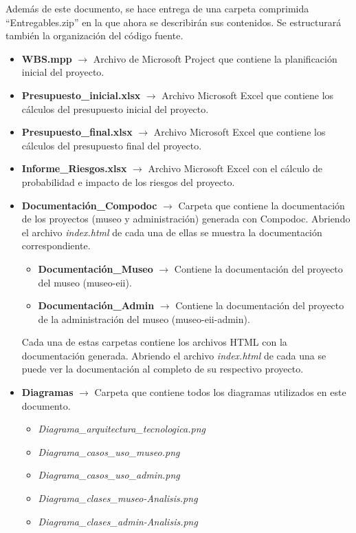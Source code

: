 Además de este documento, se hace entrega de una carpeta comprimida ``Entregables.zip'' en la que ahora se describirán sus contenidos. Se estructurará también la organización del código fuente.
\begin{itemize}
	\item \textbf{WBS.mpp} \(\rightarrow\) Archivo de Microsoft Project que contiene la planificación inicial del proyecto.
	\item \textbf{Presupuesto\_inicial.xlsx} \(\rightarrow\) Archivo Microsoft Excel que contiene los cálculos del presupuesto inicial del proyecto.
	\item \textbf{Presupuesto\_final.xlsx} \(\rightarrow\) Archivo Microsoft Excel que contiene los cálculos del presupuesto final del proyecto.
	\item \textbf{Informe\_Riesgos.xlsx} \(\rightarrow\) Archivo Microsoft Excel con el cálculo de probabilidad e impacto de los riesgos del proyecto.
	\item \textbf{Documentación\_Compodoc} \(\rightarrow\) Carpeta que contiene la documentación de los proyectos (museo y administración) generada con Compodoc. Abriendo el archivo \textit{index.html} de cada una de ellas se muestra la documentación correspondiente.
	\begin{itemize}
		\item \textbf{Documentación\_Museo} \(\rightarrow\) Contiene la documentación del proyecto del museo (museo-eii).
		\item \textbf{Documentación\_Admin} \(\rightarrow\) Contiene la documentación del proyecto de la administración del museo (museo-eii-admin).
	\end{itemize}
 	Cada una de estas carpetas contiene los archivos HTML con la documentación generada. Abriendo el archivo \textit{index.html} de cada una se puede ver la documentación al completo de su respectivo proyecto.
	\item \textbf{Diagramas} \(\rightarrow\) Carpeta que contiene todos los diagramas utilizados en este documento.
	\begin{itemize}
		\item \textit{Diagrama\_arquitectura\_tecnologica.png}
		\item \textit{Diagrama\_casos\_uso\_museo.png}
		\item \textit{Diagrama\_casos\_uso\_admin.png}
		\item \textit{Diagrama\_clases\_museo-Analisis.png}
		\item \textit{Diagrama\_clases\_admin-Analisis.png}

\end{itemize}
\end{itemize}
